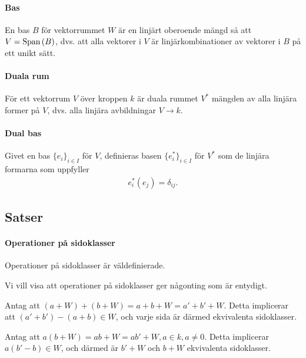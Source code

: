 \paragraph{Bas}
En bas $B$ för vektorrummet $W$ är en linjärt oberoende mängd så att $V = \text{Span}\left(B\right)$, dvs. att alla vektorer i $V$ är linjärkombinationer av vektorer i $B$ på ett unikt sätt.

\paragraph{Duala rum}
För ett vektorrum $V$ över kroppen $k$ är duala rummet $V^{*}$ mängden av alla linjära former på $V$, dvs. alla linjära avbildningar $V\to k$.

\paragraph{Dual bas}
Givet en bas $\{e_{i}\}_{i\in I}$ för $V$, definieras basen $\{e_{i}^{*}\}_{i\in I}$ för $V^{*}$ som de linjära formarna som uppfyller
\begin{align*}
	e_{i}^{*}(e_{j}) = \delta_{ij}.
\end{align*}

\subsection{Satser}

\paragraph{Operationer på sidoklasser}
Operationer på sidoklasser är väldefinierade.

\proof
Vi vill visa att operationer på sidoklasser ger någonting som är entydigt.

Antag att $(a + W) + (b + W) = a + b + W = a' + b' + W$. Detta implicerar att $(a' + b') - (a + b)\in W$, och varje sida är därmed ekvivalenta sidoklasser.

Antag att $a(b + W) = ab + W = ab' + W, a\in k, a\neq 0$. Detta implicerar $a(b' - b)\in W$, och därmed är $b' + W$ och $b + W$ ekvivalenta sidoklasser.